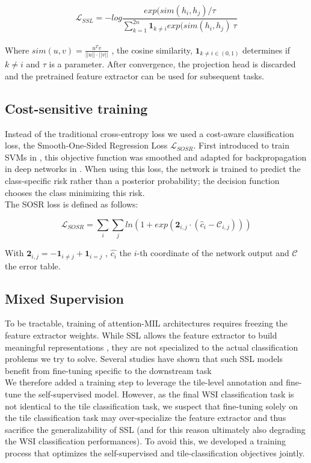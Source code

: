 \begin{equation}
\mathcal{L}_{SSL} = -log \frac{exp(sim(h_i, h_j) / \tau}{\sum^{2n}_{k=1} \mathbf{1}_{k \neq i} exp(sim(h_i, h_j) \ \tau } 
\end{equation}
\\

Where $sim( u, v ) = \frac{u^{T} v}{|| u ||\cdot|| v ||}$ , the cosine similarity, $\mathbf{1}_{k \neq i \in (0, 1) }$  determines if $k \neq i$ and $\tau$ is a parameter. After convergence, the projection head is discarded and the pretrained feature extractor can be used for subsequent tasks.

\subsection{Cost-sensitive training}
Instead of the traditional cross-entropy loss we used a cost-aware classification loss, the Smooth-One-Sided Regression Loss $\mathcal{L}_{SOSR}$. First introduced to train SVMs in \citep{tu_one-sided_2010}, this objective function was smoothed and adapted for backpropagation in deep networks in \citep{chung_cost-aware_2016}. When using this loss, the network is trained to predict the class-specific risk   rather than a posterior probability; the decision function chooses the class minimizing this risk.  \\
The SOSR loss is defined as follows:

\begin{equation}
\mathcal{L}_{SOSR} = \sum_i \sum_j ln(1 + exp(\mathbf{2}_{i,j} \cdot (\hat{c}_i - \mathcal{C}_{i,j})))
\end{equation}

With $\mathbf{2}_{i,j} = - \mathbf{1}_{i \neq j}  + \mathbf{1}_{i = j}$ , $\hat{c_i}$ the $i$-th coordinate of the network output and $\mathcal{C}$ the error table.

\subsection{Mixed Supervision}
To be tractable, training of attention-MIL architectures requires freezing the feature extractor weights. While SSL allows the feature extractor to build meaningful representations \citep{saillard_identification_2021, dehaene_self-supervision_2020}, they are not specialized to the actual classification problems we try to solve. Several studies have shown that such SSL models benefit from fine-tuning specific to the downstream task \citep{chen_simple_2020} \\
We therefore added a training step to leverage the tile-level annotation and fine-tune the self-supervised model.
However, as the final WSI classification task is not identical to the tile classification task, we suspect that fine-tuning solely on the tile classification task may over-specialize the feature extractor and thus sacrifice the generalizability of SSL (and for this reason ultimately also degrading the WSI classification performances).
To avoid this, we developed a training process that optimizes the self-supervised and tile-classification objectives jointly.

